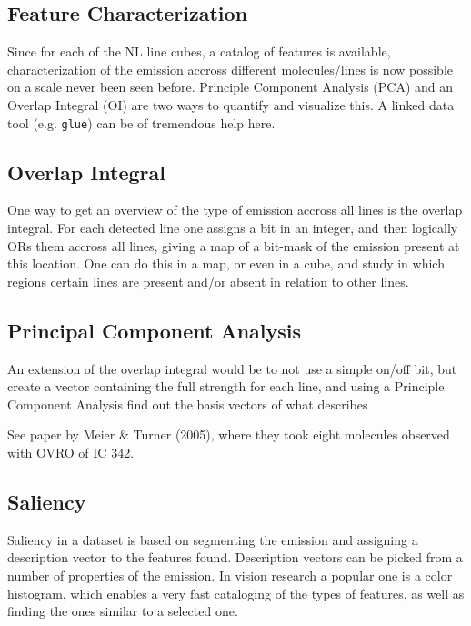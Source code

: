 \documentclass[preprint]{aastex} %
\begin{document}
\subsection{Feature Characterization}

Since for each of the NL line cubes, a catalog of features is available,
characterization of the emission accross different molecules/lines is now 
possible on a scale never been seen before. Principle Component
Analysis (PCA) and an Overlap Integral (OI) are two ways to quantify
and visualize this. A linked data tool (e.g. {\tt glue}) can be 
of tremendous help here.

\subsection{Overlap Integral}

One way to get an overview of the type of emission accross all lines
is the overlap integral.
For each detected line one assigns a bit in an integer, and then logically ORs
them accross all lines, giving a map of a bit-mask of the emission present
at this location. One can do this in a map, or even in a cube, and study
in which regions certain lines are present and/or absent in relation
to other lines.

\subsection{Principal Component Analysis}

An extension of the overlap integral would be to not use a simple on/off bit,
but create a vector containing the full strength for each line, and using
a Principle Component Analysis find out the basis vectors of what describes


See paper by Meier \& Turner (2005), where they took eight molecules 
observed with OVRO of IC 342.

\subsection{Saliency}

Saliency in a dataset is based on segmenting the emission and assigning
a description vector to the features found. Description vectors can be
picked from a number of properties of the emission. In vision research
a popular one is a color histogram, which enables a very fast
cataloging of the types of features, as well as finding the ones similar
to a selected one.
\end{document}
